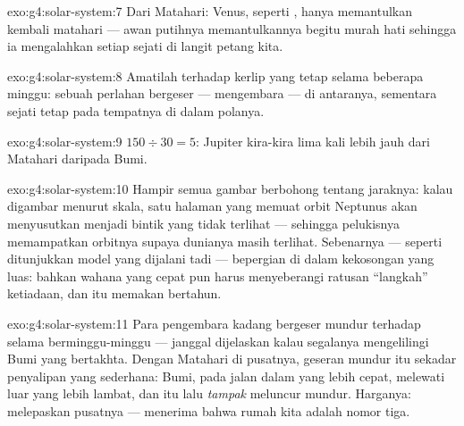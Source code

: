 \begin{solution}{exo:g4:solar-system:7}
Dari Matahari: Venus, seperti , hanya memantulkan kembali 
matahari --- awan putihnya memantulkannya begitu murah hati sehingga
ia mengalahkan setiap  sejati di langit petang kita.
\end{solution}

\begin{solution}{exo:g4:solar-system:8}
Amatilah terhadap kerlip yang tetap selama beberapa minggu: sebuah
 perlahan bergeser --- mengembara --- di antaranya, sementara
 sejati tetap pada tempatnya di dalam polanya.
\end{solution}

\begin{solution}{exo:g4:solar-system:9}
$150 \div 30 = 5$: Jupiter kira-kira lima kali lebih jauh dari
Matahari daripada Bumi.
\end{solution}

\begin{solution}{exo:g4:solar-system:10}
Hampir semua gambar berbohong tentang jaraknya: kalau digambar menurut
skala, satu halaman yang memuat orbit Neptunus akan menyusutkan
 menjadi bintik yang tidak terlihat --- sehingga pelukisnya
memampatkan orbitnya supaya dunianya masih terlihat. Sebenarnya ---
seperti ditunjukkan model yang dijalani tadi ---  bepergian di
dalam kekosongan yang luas: bahkan wahana yang cepat pun harus
menyeberangi ratusan ``langkah'' ketiadaan, dan itu memakan bertahun.
\end{solution}

\begin{solution}{exo:g4:solar-system:11}
Para pengembara kadang bergeser mundur terhadap  selama
berminggu-minggu --- janggal dijelaskan kalau segalanya mengelilingi
Bumi yang bertakhta. Dengan Matahari di pusatnya, geseran mundur itu
sekadar penyalipan yang sederhana: Bumi, pada jalan dalam yang lebih
cepat, melewati  luar yang lebih lambat, dan  itu lalu
\emph{tampak} meluncur mundur. Harganya: melepaskan pusatnya ---
menerima bahwa rumah kita adalah  nomor tiga.
\end{solution}
